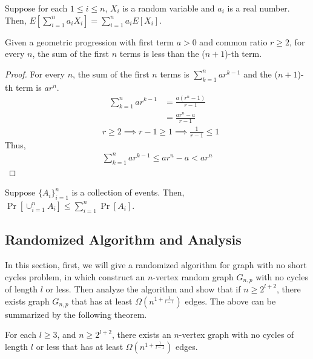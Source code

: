 \begin{lemma}\label{linearity}
Suppose for each $1 \le i \le n$, $X_i$ is a random variable and $a_i$ is a real number. Then, $E[\sum_{i=1}^na_iX_i]=\sum_{i=1}^{n}a_iE[X_i]$.
\end{lemma}
\begin{lemma}\label{gp}
Given a geometric progression with first term $a > 0$ and common ratio $r \ge 2$, for every $n$, the sum of the first $n$ terms is less than the ($n+1$)-th term.
\end{lemma}
\begin{proof}
For every $n$, the sum of the first $n$ terms is $\sum_{k=1}^{n}ar^{k-1}$ and the ($n+1$)-th term is $ar^{n}$.
\begin{align}
    \nonumber \sum_{k=1}^{n}ar^{k-1}&=\frac{a(r^{n}-1)}{r-1}\\
    \nonumber &=\frac{ar^{n}-a}{r-1}
\end{align}
\begin{align}
    \nonumber &r\ge 2 \implies r-1 \ge 1 \implies \frac{1}{r-1} \le 1
\end{align}
Thus, 
\begin{align}
    \nonumber \sum_{k=1}^{n}ar^{k-1}\le ar^{n}-a < ar^{n}
\end{align} 
\end{proof}
\begin{lemma}\label{union}
Suppose $\{A_i\}_{i=1}^n$ is a collection of events. Then, $\Pr[\cup_{i=1}^{n}A_i]\le\sum_{i=1}^{n}\Pr[A_i]$.
\end{lemma}
\subsection {Randomized Algorithm and Analysis}\label{RA}
In this section, first, we will give a randomized algorithm for graph with no short cycles problem, in which construct an $n$-vertex random graph $G_{n,p}$ with no cycles of length $l$ or less. Then analyze the algorithm and show that if $n\ge 2^{l+2}$, there exists graph $G_{n,p}$ that has at least $\Omega (n^{1+\frac{1}{l-1}})$ edges. The above can be summarized by the following theorem.
\begin{theorem}
For each $l\ge 3$, and $n\ge 2^{l+2}$, there exists an $n$-vertex graph with no cycles of length $l$ or less that has at least $\Omega (n^{1+\frac{1}{l-1}})$ edges.
\end{theorem}
